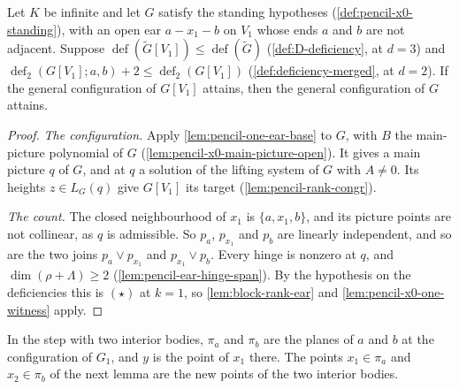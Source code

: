 \begin{theorem}
  \label{thm:pencil-x0-open-ear-one}
  \leanok
  Let $K$ be infinite and let $G$ satisfy the standing hypotheses
  (\cref{def:pencil-x0-standing}), with an open ear $a - x_1 - b$ on
  $V_1$ whose ends $a$ and $b$ are not adjacent. Suppose
  $\operatorname{def}(\tilde G[V_1]) \le \operatorname{def}(\tilde G)$
  (\cref{def:D-deficiency}, at $d = 3$) and
  $\operatorname{def}_2(G[V_1]; a, b) + 2 \le
  \operatorname{def}_2(G[V_1])$ (\cref{def:deficiency-merged}, at
  $d = 2$). If the general configuration of $G[V_1]$ attains, then the
  general configuration of $G$ attains.
\end{theorem}
\begin{proof}
  \leanok
  \emph{The configuration.} Apply \cref{lem:pencil-one-ear-base} to $G$,
  with $B$ the main-picture polynomial of $G$
  (\cref{lem:pencil-x0-main-picture-open}). It gives a main picture $q$ of
  $G$, and at $q$ a solution of the lifting system of $G$ with
  $A \neq 0$. Its heights $z \in L_G(q)$ give $G[V_1]$ its target
  (\cref{lem:pencil-rank-congr}).

  \emph{The count.} The closed neighbourhood of $x_1$ is $\{a, x_1, b\}$,
  and its picture points are not collinear, as $q$ is admissible. So
  $p_a$, $p_{x_1}$ and $p_b$ are linearly independent, and so are the two
  joins $p_a \vee p_{x_1}$ and $p_{x_1} \vee p_b$. Every hinge is
  nonzero at $q$, and $\dim(\rho + \Lambda) \ge 2$
  (\cref{lem:pencil-ear-hinge-span}). By the hypothesis on the
  deficiencies this is $(\star)$ at $k = 1$, so \cref{lem:block-rank-ear}
  and \cref{lem:pencil-x0-one-witness} apply.
\end{proof}

In the step with two interior bodies, $\pi_a$ and $\pi_b$ are the planes
of $a$ and $b$ at the configuration of $G_1$, and $y$ is the point of
$x_1$ there. The points $x_1 \in \pi_a$ and $x_2 \in \pi_b$ of the next
lemma are the new points of the two interior bodies.

